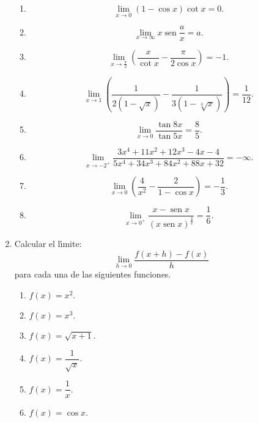 \begin{enumerate}
\begin{enumerate}
\item
\[
\lim_{x\rightarrow0}\left(  1-\cos x\right)  \cot x=\allowbreak0.
\]


\item
\[
\lim_{x\rightarrow\infty}x\operatorname{sen}\dfrac{a}{x}=\allowbreak a.
\]


\item
\[
\lim_{x\rightarrow\tfrac{\pi}{2}}\left(  \dfrac{x}{\cot x}-\dfrac{\pi}{2\cos
x}\right)  =\allowbreak-1.
\]


\item
\[
\lim_{x\rightarrow1}\left(  \dfrac{1}{2\left(  1-\sqrt{x}\right)  }-\dfrac
{1}{3\left(  1-\sqrt[3]{x}\right)  }\right)  =\allowbreak\frac{1}{12}.
\]


\item
\[
\lim_{x\rightarrow0}\dfrac{\tan8x}{\tan5x}=\allowbreak\frac{8}{5}.
\]


\item
\[
\lim_{x\rightarrow-2^{+}}\dfrac{3x^{4}+11x^{2}+12x^{3}-4x-4}{5x^{4}%
+34x^{3}+84x^{2}+88x+32}=\allowbreak-\infty.
\]


\item
\[
\lim_{x\rightarrow0}\left(  \dfrac{4}{x^{2}}-\dfrac{2}{1-\cos x}\right)
=\allowbreak-\frac{1}{3}.
\]


\item
\[
\lim_{x\rightarrow0^{+}}\dfrac{x-\operatorname{sen}x}{\left(
x\operatorname{sen}x\right)  ^{\frac{3}{2}}}=\allowbreak\frac{1}{6}.
\]

\end{enumerate}

\item Calcular el l\'{\i}mite:
\[
\lim_{h\rightarrow0}\dfrac{f(x+h)-f\left(  x\right)  }{h}%
\]
para cada una de las siguientes funciones.

\begin{enumerate}
\item $f\left(  x\right)  =x^{2}.$

\item $f(x)=x^{3}.$

\item $f(x)=\sqrt{x+1}.$

\item $f(x)=\dfrac{1}{\sqrt{x}}.$

\item $f(x)=\dfrac{1}{x}.$

\item $f(x)=\cos x.$
\end{enumerate}


\end{enumerate}
